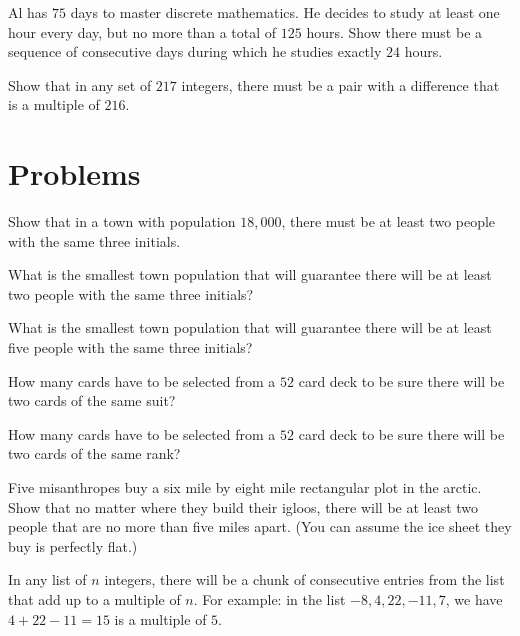 \begin{exer}
Al has $75$ days to master discrete mathematics. He decides to study
at least one hour every day, but no more than a total of $125$ hours.
Show there must be a sequence of consecutive days during which
he studies exactly $24$ hours.
\end{exer}

\begin{exer}
Show that in any set of $217$ integers, there must be a pair
with a difference that is a multiple of $216$.
\end{exer}

\section{Problems}

\begin{prob}
Show that in a town with population $18,000$, there must be at least two people with the same three initials. 
\end{prob}

\begin{prob}
What is the smallest town population that will guarantee there will be at least two people with the same three initials?
\end{prob}

\begin{prob}
What is the smallest town population that will guarantee there will be at least five people with the same three initials?
\end{prob}

\begin{prob}
How many cards have to be selected from a $52$ card deck to be sure there will be two cards of the same suit?
\end{prob}

\begin{prob}
How many cards have to be selected from a $52$ card deck to be sure there will be two cards of the same rank?
\end{prob}

\begin{prob}
Five misanthropes buy a six mile by eight mile rectangular plot in the arctic. Show that no matter where they build 
their igloos, there will be at least two people that are no more than five miles apart. (You can assume the ice sheet
they buy is perfectly flat.)
\end{prob}

\begin{prob}
In any list of $n$ integers, there will be a  chunk of  consecutive entries from the list that add up to a multiple of $n$.
For example: in the list $-8, 4, 22, -11, 7$, we have $4+22-11= 15$ is a multiple of $5$. 
\end{prob}

